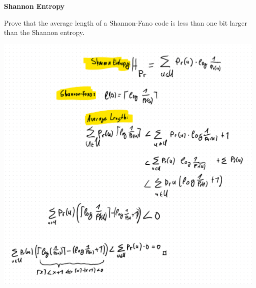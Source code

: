 \question \textbf{Shannon Entropy}

Prove that the average length of a Shannon-Fano code is less than one bit larger than the Shannon entropy.


\begin{solution}


\includegraphics[width=0.8\linewidth]{task_3/solution_a3.png}
\end{solution}
